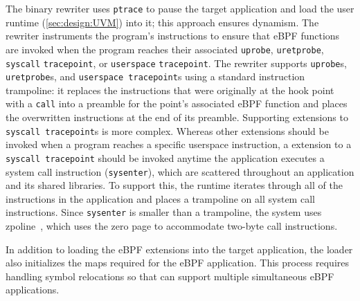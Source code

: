 The binary rewriter uses \texttt{ptrace} to pause the target application and load the \sys{} user runtime (\cref{sec:design:UVM}) into it; this approach ensures dynamism.   The rewriter instruments the program's instructions to ensure that eBPF functions are invoked when the program reaches their associated \texttt{uprobe}, \texttt{uretprobe}, \texttt{syscall} \texttt{tracepoint}, or \texttt{userspace} \texttt{tracepoint}.  The rewriter supports \texttt{uprobe}s, \texttt{uretprobe}s, and \texttt{userspace tracepoint}s using a standard instruction trampoline: it replaces the instructions that were originally at the hook point with a \texttt{call} into a preamble for the point's associated eBPF function and places the overwritten instructions at the end of its preamble.  Supporting extensions to \texttt{syscall tracepoint}s is more complex.  Whereas other extensions should be invoked when a program reaches a specific userspace instruction, a extension to a \texttt{syscall tracepoint} should be invoked anytime the application executes a system call instruction (\ie \texttt{sysenter}), which are scattered throughout an application and its shared libraries.  To support this, the runtime iterates through all of the instructions in the application and places a trampoline on all system call instructions.  Since \texttt{sysenter} is smaller than a trampoline, the system uses zpoline~\cite{yasukata2023zpoline}, which uses the zero page to accommodate two-byte call instructions.

In addition to loading the eBPF extensions into the target application, the \sys{} loader also initializes the \sys{} maps required for the eBPF application. This process requires handling symbol relocations so that \sys{} can support multiple simultaneous eBPF applications.




